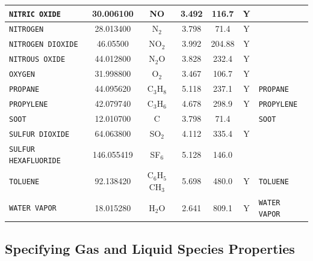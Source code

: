 \documentclass[11pt]{book}
\newcommand{\ct}{\tt\small}
\begin{document}
\begin{table}[p]
\begin{center}
\begin{tabular}{|l|c|c|c|c|c|l|}
{\ct NITRIC OXIDE}       & 30.006100  & NO               & 3.492    & 116.7    &  Y       &                                 \\ \hline
{\ct NITROGEN}           & 28.013400  & N$_2$            & 3.798    & 71.4     &  Y       &                                 \\ \hline
{\ct NITROGEN DIOXIDE}   & 46.05500   & NO$_2$           & 3.992    & 204.88   &  Y       &                                 \\ \hline
{\ct NITROUS OXIDE}      & 44.012800  & N$_2$O           & 3.828    & 232.4    &  Y       &                                 \\ \hline
{\ct OXYGEN}             & 31.998800  & O$_2$            & 3.467    & 106.7    &  Y       &                                 \\ \hline
{\ct PROPANE}            & 44.095620  & C$_3$H$_8$       & 5.118    & 237.1    &  Y       &  {\ct PROPANE}                  \\ \hline
{\ct PROPYLENE}          & 42.079740  & C$_3$H$_6$       & 4.678    & 298.9    &  Y       &  {\ct PROPYLENE}                \\ \hline
{\ct SOOT}               & 12.010700  & C                & 3.798    & 71.4     &          &  {\ct SOOT}                     \\ \hline
{\ct SULFUR DIOXIDE}     & 64.063800  & SO$_2$           & 4.112    & 335.4    &  Y       &                                 \\ \hline
{\ct SULFUR HEXAFLUORIDE}& 146.055419 & SF$_6$           & 5.128    & 146.0    &          &                                 \\ \hline
{\ct TOLUENE}            & 92.138420  & C$_6$H$_5$CH$_3$ & 5.698    & 480.0    &  Y       &  {\ct TOLUENE}                  \\ \hline
{\ct WATER VAPOR}        & 18.015280  & H$_2$O           & 2.641    & 809.1    &  Y       &  {\ct WATER VAPOR}              \\ \hline
\end{tabular}
\end{center}
\end{table}

\subsection{Specifying Gas and Liquid Species Properties}

\label{gas_species_props}
\end{document}
